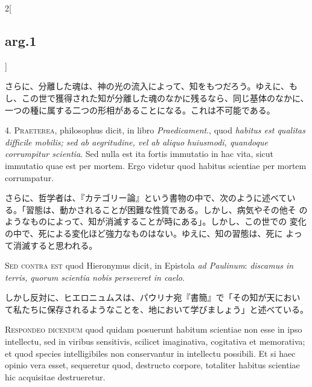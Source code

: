 \documentclass[paper=a4paper,fontsize=10pt,jafontsize=9pt,titlepage]{jlreq}
\begin{document}
\begin{paracol}{2}[\subsection{arg.1}]
\switchcolumn

さらに、分離した魂は、神の光の流入によって、知をもつだろう。ゆえに、も
し、この世で獲得された知が分離した魂のなかに残るなら、同じ基体のなかに、
一つの種に属する二つの形相があることになる。これは不可能である。


4. {\scshape Praeterea}, philosophus dicit, in libro {\itshape Praedicament}.,
quod {\itshape habitus est qualitas difficile mobilis; sed ab aegritudine,
vel ab aliquo huiusmodi, quandoque corrumpitur scientia}. Sed nulla
est ita fortis immutatio in hac vita, sicut immutatio quae est per
mortem. Ergo videtur quod habitus scientiae per mortem corrumpatur.

\switchcolumn

さらに、哲学者は、『カテゴリー論』という書物の中で、次のように述べてい
る。「習態は、動かされることが困難な性質である。しかし、病気やその他そ
のようなものによって、知が消滅することが時にある」。しかし、この世での
変化の中で、死による変化ほど強力なものはない。ゆえに、知の習態は、死に
よって消滅すると思われる。

\switchcolumn*[\subsection{s.c.}]

{\scshape Sed contra est} quod Hieronymus dicit, in Epistola {\itshape ad
Paulinum}: {\itshape discamus in terris, quorum scientia nobis perseveret
in caelo}.

\switchcolumn

しかし反対に、ヒエロニュムスは、パウリナ宛『書簡』で「その知が天におい
て私たちに保存されるようなことを、地において学びましょう」と述べている。


{\scshape Respondeo dicendum} quod quidam posuerunt habitum scientiae non
esse in ipso intellectu, sed in viribus sensitivis, scilicet
imaginativa, cogitativa et memorativa; et quod species intelligibiles
non conservantur in intellectu possibili. Et si haec opinio vera
esset, sequeretur quod, destructo corpore, totaliter habitus scientiae
hic acquisitae destrueretur.


\end{paracol}
\end{document}
